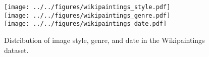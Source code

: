 \begin{figure}[th]
\centering
\texttt{[image: ../../figures/wikipaintings\_style.pdf]}\\
\texttt{[image: ../../figures/wikipaintings\_genre.pdf]}\\
\texttt{[image: ../../figures/wikipaintings\_date.pdf]}
\caption{Distribution of image style, genre, and date in the Wikipaintings dataset.}
\label{fig:wikipaintings_data}
\end{figure}
